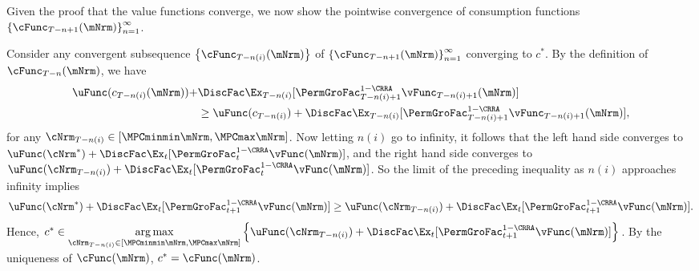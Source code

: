 \documentclass[\econtexRoot/BufferStockTheory]{subfiles}
\begin{document}
Given the proof that the value functions converge, we now show the
pointwise convergence of consumption functions
$\left\{\cFunc_{T-n+1}(\mNrm)\right\} _{n=1}^{\infty }$.

Consider any convergent subsequence $\left\{\cFunc_{T-n(i)}(\mNrm)\right\}$ of $\left\{\cFunc_{T-n+1}(\mNrm)\right\} _{n=1}^{\infty }$ converging to $c^*$.
By the definition of $\cFunc_{T-n}(\mNrm)$, we have
\begin{align}
  \begin{aligned}
    \uFunc(c_{T - n(i)}(\mNrm)) + & \DiscFac \Ex_{T - n(i)}[{\PermGroFac}_{T-n(i)+1}^{1 - \CRRA}\vFunc_{T-n(i)+1}(\mNrm)]  \\ & \geq  \uFunc(c_{T - n(i)}) + \DiscFac \Ex_{T - n(i)}[{\PermGroFac}_{T-n(i)+1}^{1 - \CRRA}\vFunc_{T-n(i)+1}(\mNrm)], 
    \end{aligned}
\end{align}
for any $\cNrm_{T - n(i)} \in [\MPCminmin \mNrm,\MPCmax \mNrm]$.
Now letting $n(i)$ go to infinity, it follows that the left hand side converges to $\uFunc(\cNrm^*) + \DiscFac \Ex_{t}[{\PermGroFac}_{t}^{1 - \CRRA}\vFunc(\mNrm)]$, and the right hand side converges to $\uFunc(\cNrm_{T - n(i)}) + \DiscFac \Ex_{t}[{\PermGroFac}_{t}^{1 - \CRRA}\vFunc(\mNrm)]$.
So the limit of the preceding inequality as $n(i)$ approaches infinity implies 
\begin{equation}
   \uFunc(\cNrm^*) + \DiscFac \Ex_{t}[{\PermGroFac}_{t + 1}^{1 - \CRRA}\vFunc(\mNrm)] \geq \uFunc(\cNrm_{T - n(i)}) + \DiscFac \Ex_{t}[{\PermGroFac}_{t + 1}^{1 - \CRRA}\vFunc(\mNrm)].
\end{equation}
Hence, $c^* \in \underset{\cNrm_{T - n(i)} \in [\MPCminmin \mNrm,\MPCmax \mNrm]}{\arg \max }\left\{ \uFunc(\cNrm_{T - n(i)}) + \DiscFac \Ex_{t}[{\PermGroFac}_{t + 1}^{1 - \CRRA}\vFunc(\mNrm)]\right\}$.
By the uniqueness of $\cFunc(\mNrm)$, $c^* = \cFunc(\mNrm)$.
\end{document}
